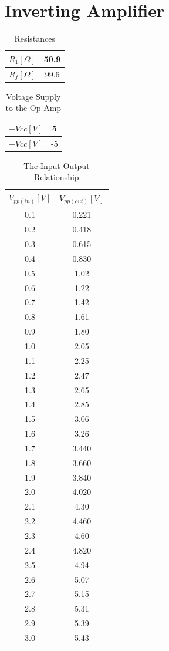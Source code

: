 \documentclass{article}
\begin{document}
\section{Inverting Amplifier}
\begin{table}[H]
	\centering
	\begin{tabular}{|c|c|}
		\hline
		$R_1[\Omega]$&50.9\\
		\hline
		$R_f[\Omega]$&99.6\\
		\hline
	\end{tabular}
	\caption{Resistances}
\end{table}
\begin{table}[H]
	\centering
	\begin{tabular}{|c|c|}
		\hline
		$+Vcc[V]$&5\\
		\hline
		$-Vcc[V]$&-5\\
		\hline
	\end{tabular}
	\caption{Voltage Supply to the Op Amp}
\end{table}
\begin{table}[H]
	\centering
	\begin{tabular}{|c|c|}
		\hline
		$V_{pp(in)}[V]$&$V_{pp(out)}[V]$\\
		\hline
		0.1&0.221\\
		\hline
		0.2&0.418\\
		\hline
		0.3&0.615\\
		\hline
		0.4&0.830\\
		\hline
		0.5&1.02\\
		\hline
		0.6&1.22\\
		\hline
		0.7&1.42\\
		\hline
		0.8&1.61\\
		\hline
		0.9&1.80\\
		\hline
		1.0&2.05\\
		\hline
		1.1&2.25\\
		\hline
		1.2&2.47\\
		\hline
		1.3&2.65\\
		\hline
		1.4&2.85\\
		\hline
		1.5&3.06\\
		\hline
		1.6&3.26\\
		\hline
		1.7&3.440\\
		\hline
		1.8&3.660\\
		\hline
		1.9&3.840\\
		\hline
		2.0&4.020\\
		\hline
		2.1&4.30\\
		\hline
		2.2&4.460\\
		\hline
		2.3&4.60\\
		\hline
		2.4&4.820\\
		\hline
		2.5&4.94\\
		\hline
		2.6&5.07\\
		\hline
		2.7&5.15\\
		\hline
		2.8&5.31\\
		\hline
		2.9&5.39\\
		\hline
		3.0&5.43\\
		\hline
	\end{tabular}
	\caption{The Input-Output Relationship}
\end{table}
\end{document}

